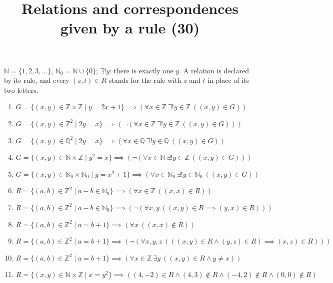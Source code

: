 \documentclass[11pt,a4paper]{article}
\title{Relations and correspondences given by a rule (30)}
\author{}
\date{}
\begin{document}
\maketitle
$\mathbb{N} = \{1, 2, 3, \ldots\}$, $\mathbb{N}_{0} = \mathbb{N} \cup \{0\}$; $\exists! y$: there is exactly one $y$. A relation is declared by its rule, and every $(s, t) \in R$ stands for the rule with $s$ and $t$ in place of its two letters.

\begin{enumerate}
\item $\displaystyle G = \{(x, y) \in \mathbb{Z} \times \mathbb{Z} \mid y = 2x + 1\} \implies (\forall x \in \mathbb{Z}\ \exists! y \in \mathbb{Z}\ ((x, y) \in G))$
\item $\displaystyle G = \{(x, y) \in \mathbb{Z}^{2} \mid 2y = x\} \implies (\lnot (\forall x \in \mathbb{Z}\ \exists! y \in \mathbb{Z}\ ((x, y) \in G)))$
\item $\displaystyle G = \{(x, y) \in \mathbb{Q}^{2} \mid 2y = x\} \implies (\forall x \in \mathbb{Q}\ \exists! y \in \mathbb{Q}\ ((x, y) \in G))$
\item $\displaystyle G = \{(x, y) \in \mathbb{N} \times \mathbb{Z} \mid y^{2} = x\} \implies (\lnot (\forall x \in \mathbb{N}\ \exists! y \in \mathbb{Z}\ ((x, y) \in G)))$
\item $\displaystyle G = \{(x, y) \in \mathbb{N}_{0} \times \mathbb{N}_{0} \mid y = x^{2} + 1\} \implies (\forall x \in \mathbb{N}_{0}\ \exists! y \in \mathbb{N}_{0}\ ((x, y) \in G))$
\item $\displaystyle R = \{(a, b) \in \mathbb{Z}^{2} \mid a - b \in \mathbb{N}_{0}\} \implies (\forall x \in \mathbb{Z}\ ((x, x) \in R))$
\item $\displaystyle R = \{(a, b) \in \mathbb{Z}^{2} \mid a - b \in \mathbb{N}_{0}\} \implies (\lnot (\forall x, y\ ((x, y) \in R \implies (y, x) \in R)))$
\item $\displaystyle R = \{(a, b) \in \mathbb{Z}^{2} \mid a = b + 1\} \implies (\forall x\ ((x, x) \notin R))$
\item $\displaystyle R = \{(a, b) \in \mathbb{Z}^{2} \mid a = b + 1\} \implies (\lnot (\forall x, y, z\ (((x, y) \in R \land (y, z) \in R) \implies (x, z) \in R)))$
\item $\displaystyle R = \{(a, b) \in \mathbb{Z}^{2} \mid a = b + 1\} \implies (\forall x \in \mathbb{Z}\ \exists y\ ((x, y) \in R \land y \neq x))$
\item $\displaystyle R = \{(x, y) \in \mathbb{N} \times \mathbb{Z} \mid x = y^{2}\} \implies ((4, -2) \in R \land (4, 3) \notin R \land (-4, 2) \notin R \land (0, 0) \notin R)$

\end{enumerate}
\end{document}
